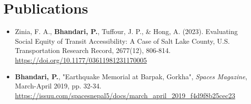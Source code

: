 \section{\faFile* \textbf{ Publications}}
    \begin{itemize}[leftmargin=0.15in, label={}]
    	\item{Zinia, F. A., \textbf{Bhandari, P.}, Tuffour, J. P., \& Hong, A. (2023). Evaluating Social Equity of Transit Accessibility: A Case of Salt Lake County, U.S. Transportation Research Record, 2677(12), 806-814. \url{https://doi.org/10.1177/03611981231170005}} \\
         \item{\textbf{Bhandari, P.}, "Earthquake Memorial at Barpak, Gorkha", \textit{Spaces Magazine}, March-April 2019, pp. 32-34. \url{https://issuu.com/spacesnepal5/docs/march_april_2019_f4d9f8b25cec23}} \\
    \end{itemize}